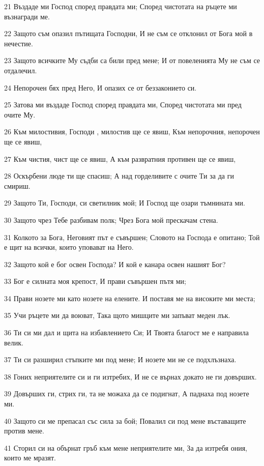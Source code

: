 \par 21 Въздаде ми Господ според правдата ми; Според чистотата на ръцете ми възнагради ме.
\par 22 Защото съм опазил пътищата Господни, И не съм се отклонил от Бога мой в нечестие.
\par 23 Защото всичките Му съдби са били пред мене; И от повеленията Му не съм се отдалечил.
\par 24 Непорочен бях пред Него, И опазих се от беззаконието си.
\par 25 Затова ми въздаде Господ според правдата ми, Според чистотата ми пред очите Му.
\par 26 Към милостивия, Господи , милостив ще се явиш, Към непорочния, непорочен ще се явиш,
\par 27 Към чистия, чист ще се явиш, А към развратния противен ще се явиш,
\par 28 Оскърбени люде ти ще спасиш; А над горделивите с очите Ти за да ги смириш.
\par 29 Защото Ти, Господи, си светилник мой; И Господ ще озари тъмнината ми.
\par 30 Защото чрез Тебе разбивам полк; Чрез Бога мой прескачам стена.
\par 31 Колкото за Бога, Неговият път е съвършен; Словото на Господа е опитано; Той е щит на всички, които уповават на Него.
\par 32 Защото кой е бог освен Господа? И кой е канара освен нашият Бог?
\par 33 Бог е силната моя крепост, И прави съвършен пътя ми;
\par 34 Прави нозете ми като нозете на елените. И поставя ме на високите ми места;
\par 35 Учи ръцете ми да воюват, Така щото мишците ми запъват меден лък.
\par 36 Ти си ми дал и щита на избавлението Си; И Твоята благост ме е направила велик.
\par 37 Ти си разширил стъпките ми под мене; И нозете ми не се подхлъзнаха.
\par 38 Гоних неприятелите си и ги изтребих, И не се върнах докато не ги довърших.
\par 39 Довърших ги, стрих ги, та не можаха да се подигнат, А паднаха под нозете ми.
\par 40 Защото си ме препасал със сила за бой; Повалил си под мене въставащите против мене.
\par 41 Сторил си на обърнат гръб към мене неприятелите ми, За да изтребя ония, които ме мразят.
